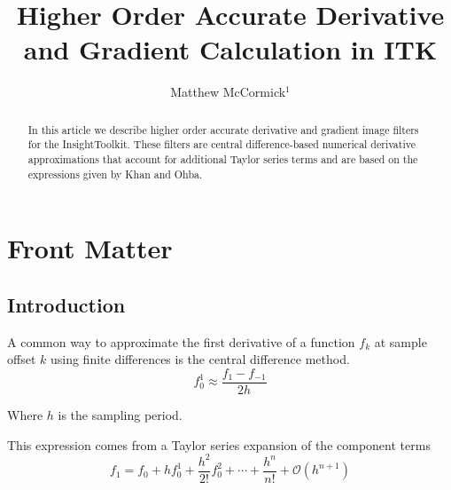 \documentclass{InsightArticle}
\title{Higher Order Accurate Derivative and Gradient Calculation in ITK}
\author{Matthew McCormick$^{1}$}
\newcommand{\IJhandlerIDnumber}{9999}
\begin{document}
%
%
\IJhandlefooter{\IJhandlerIDnumber}


\ifpdf
\else
\fi


\maketitle


\ifhtml
\chapter*{Front Matter\label{front}}
\fi


\begin{abstract}
\noindent In this article we describe higher order accurate derivative and gradient
image filters for the InsightToolkit.  These filters are central difference-based
numerical derivative approximations that account for additional Taylor
series terms and are based on the expressions given by Khan and Ohba.
\end{abstract}

\IJhandlenote{\IJhandlerIDnumber}

\tableofcontents

\section{Introduction}

A common way to approximate the first derivative of a function $f_k$ at sample offset $k$ using
finite differences is the central difference method.
\begin{equation}
  f^1_0  \approx \frac{f_1 - f_{-1}} { 2 h }
\end{equation}

Where $h$ is the sampling period.

This expression comes from a Taylor series expansion of the component terms
\begin{equation}
  f_1 = f_0 + h f^1_0 + \frac{h^2}{2!}f^2_0 + \cdots + \frac{h^n}{n!} +
  \mathcal{O}(h^{n+1})
\end{equation}
\end{document}
